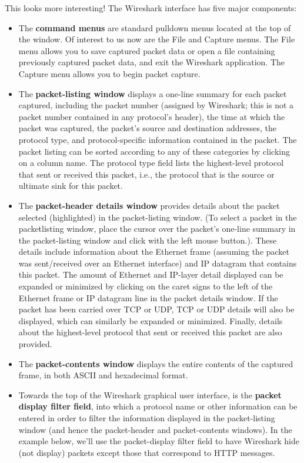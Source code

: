 \documentclass[11pt,a4paper]{article}
\begin{document}
This looks more interesting! The Wireshark interface has five major components:
\begin{itemize}
    \item The \textbf{command menus} are standard pulldown menus located at the top of the
    window. Of interest to us now are the File and Capture menus. The File menu
    allows you to save captured packet data or open a file containing previously
    captured packet data, and exit the Wireshark application. The Capture menu
    allows you to begin packet capture.
    \item The \textbf{packet-listing window} displays a one-line summary for each packet captured, including the packet number (assigned by Wireshark; this is not a packet number contained in any protocol's header), the time at which the packet was captured, the packet's source and destination addresses, the protocol type,  and protocol-specific information contained in the packet. The packet listing can be sorted according to any of these categories by clicking on a column name. The protocol type field lists the highest-level protocol that sent or received this packet, i.e., the protocol that is the source or ultimate sink for this packet.
    \item The \textbf{packet-header details window} provides details about the packet selected (highlighted) in the packet-listing window. (To select a packet in the packetlisting window, place the cursor over the packet's one-line summary in the packet-listing window and click with the left mouse button.). These details include information about the Ethernet frame (assuming the packet was sent/received over an Ethernet interface) and IP datagram that contains this packet. The amount of Ethernet and IP-layer detail displayed can be expanded or minimized by clicking on the caret signs to the left of the Ethernet frame or IP datagram line in the packet details window. If the packet has been carried over TCP or UDP, TCP or UDP details will also be displayed, which can similarly be expanded or minimized. Finally, details about the highest-level protocol that sent or received this packet are also provided.
    \item The \textbf{packet-contents window} displays the entire contents of the captured frame, in both ASCII and hexadecimal format.
    \item Towards the top of the Wireshark graphical user interface, is the \textbf{packet display filter field}, into which a protocol name or other information can be entered in order to filter the information displayed in the packet-listing window (and hence the packet-header and packet-contents windows). In the example below, we'll use the packet-display filter field to have Wireshark hide (not display) packets except those that correspond to HTTP messages.
\end{itemize}
\end{document}
